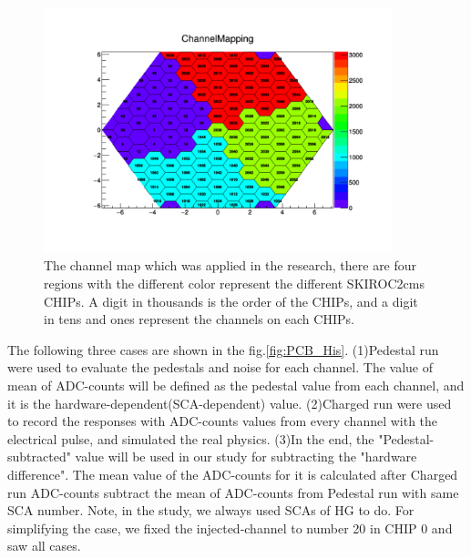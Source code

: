 \begin{figure}[!htb]
\centering
     \includegraphics[width=0.9\textwidth]{PCB_study/channelmap.pdf}
\caption{The channel map which was applied in the research, there are four regions with the different color represent the different SKIROC2cms CHIPs.  A digit in thousands is the order of the CHIPs, and a digit in tens and ones represent the channels on each CHIPs.}
\label{fig:PCB_study_channelMap}
\end{figure}

The following three cases are shown in the fig.\ref{fig:PCB_His}. (1)Pedestal run were used to evaluate the pedestals and noise for each channel. The value of mean of ADC-counts will be defined as the pedestal value from each channel, and it is the hardware-dependent(SCA-dependent) value. (2)Charged run were used to record the responses with ADC-counts values from every channel with the electrical pulse, and simulated the real physics. (3)In the end, the "Pedestal-subtracted" value will be used in our study for subtracting the "hardware difference". The mean value of the ADC-counts for it is calculated after Charged run ADC-counts subtract the mean of ADC-counts from Pedestal run with same SCA number. Note, in the study, we always used SCAs of HG to do. For simplifying the case, we fixed the injected-channel to number 20 in CHIP 0 and saw all cases.

